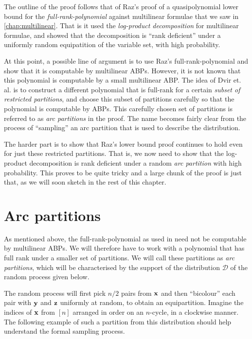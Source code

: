The outline of the proof follows that of Raz's proof \cite{raz2004} of a quasipolynomial lower bound for the \emph{full-rank-polynomial} against multilinear formulae that we saw in \autoref{chap:multilinear}. That is it used the \emph{log-product decomposition} for multilinear formulae, and showed that the decomposition is ``rank deficient'' under a uniformly random equipatition of the variable set, with high probability.

At this point, a possible line of argument is to use Raz's full-rank-polynomial and show that it is computable by multilinear ABPs.
However, it is not known that this polynomial is computable by a small multilinear ABP.
The idea of Dvir et. al. is to construct a different polynomial that is full-rank for a certain \emph{subset of restricted partitions}, and choose this subset of partitions carefully so that the polynomial is computable by ABPs.
This carefully chosen set of partitions is referred to as \emph{arc partitions} in the proof.
The name becomes fairly clear from the process of ``sampling'' an arc partition that is  used to describe the distribution.

The harder part is to show that Raz's lower bound proof continues to hold even for just these restricted partitions. That is, we now need to show that the log-product decomposition is rank deficient under a random \emph{arc partition} with high probability. This proves to be quite tricky and a large chunk of the proof is just that, as we will soon sketch in the rest of this chapter. 

\section{Arc partitions}

As mentioned above, the full-rank-polynomial as used in \cite{raz2004} need not be computable by multilinear ABPs. We will therefore have to work with a polynomial that has full rank under a smaller set of partitions. We will call these partitions as \emph{arc partitions}, which will be characterised by the support of the distribution $\mathcal{D}$ of the random process given below.

The random process will first pick $n/2$ pairs from $\mathbf{x}$ and then ``bicolour'' each pair with $\mathbf{y}$ and $\mathbf{z}$ uniformly at random, to obtain an equipartition. Imagine the indices of $\mathbf{x}$ from $[n]$ arranged in order on an $n$-cycle, in a clockwise manner. The following example of such a partition from this distribution should help understand the formal sampling process. 

